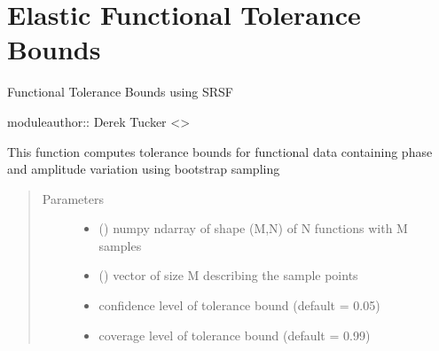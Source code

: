 \documentclass[letterpaper,10pt,english]{sphinxmanual}
\begin{document}
\chapter{Elastic Functional Tolerance Bounds}
\label{\detokenize{tolerance:module-tolerance}}\label{\detokenize{tolerance:elastic-functional-tolerance-bounds}}\label{\detokenize{tolerance::doc}}
Functional Tolerance Bounds using SRSF

moduleauthor:: Derek Tucker \textless{}\textgreater{}

\begin{fulllineitems}
\label{\detokenize{tolerance:tolerance.bootTB}}
This function computes tolerance bounds for functional data containing
phase and amplitude variation using bootstrap sampling
\begin{quote}\begin{description}
\item[{Parameters}] \leavevmode\begin{itemize}
\item {} 
 () \textendash{} numpy ndarray of shape (M,N) of N functions with M samples

\item {} 
 () \textendash{} vector of size M describing the sample points

\item {} 
 \textendash{} confidence level of tolerance bound (default = 0.05)

\item {} 
 \textendash{} coverage level of tolerance bound (default = 0.99)


\end{itemize}
\end{description}
\end{quote}
\end{fulllineitems}
\end{document}
